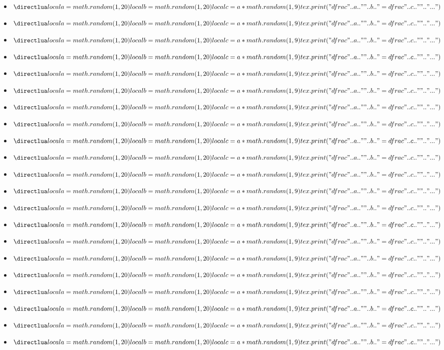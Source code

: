\documentclass["../Cours.tex"]{subfiles}
\begin{document}
\vspace{0.5cm}

\begin{multicols}{3}
\begin{itemize}
    \item $\trandom$
    \item $\trandom$
    \item $\trandom$
    \item $\trandom$
    \item $\trandom$
    \item $\trandom$
    \item $\trandom$
    \item $\trandom$
    \item $\trandom$
    \item $\trandom$
    \item $\trandom$
    \item $\trandom$
    \item $\trandom$
    \item $\trandom$
    \item $\trandom$
    \item $\trandom$
    \item $\trandom$
    \item $\trandom$
    \item $\trandom$
    \item $\trandom$
    \item $\trandom$
\end{itemize}
\end{multicols}
\end{document}
